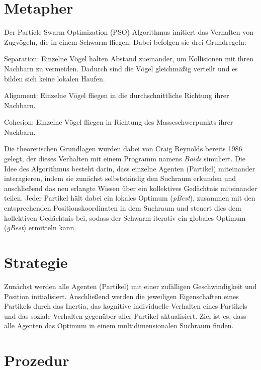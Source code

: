 
\section{Metapher}

Der Particle Swarm Optimization (PSO) Algorithmus imitiert das Verhalten von
Zugvögeln, die in einem Schwarm fliegen. Dabei befolgen sie drei Grundregeln:
\begin{enumerate}[{[i]}]
    \item Separation: Einzelne Vögel halten Abstand zueinander, um
        Kollisionen mit ihren Nachbarn zu vermeiden. Dadurch sind die Vögel
        gleichmäßig verteilt und es bilden sich keine lokalen Haufen.
    \item Alignment: Einzelne Vögel fliegen in die durchschnittliche
        Richtung ihrer Nachbarn. 
    \item Cohesion: Einzelne Vögel fliegen in Richtung des
        Masseschwerpunkts ihrer Nachbarn.
\end{enumerate}

Die theoretischen Grundlagen wurden dabei von Craig Reynolds bereits 1986
gelegt, der dieses Verhalten mit einem Programm namens \emph{Boids}
simuliert. Die Idee des Algorithmus besteht darin, dass einzelne Agenten
(Partikel) miteinander interagieren, indem sie zunächst selbstständig den
Suchraum erkunden und anschließend das neu erlangte Wissen über ein
kollektives Gedächtnis miteinander teilen. Jeder Partikel hält dabei
ein lokales Optimum (\emph{pBest}), zusammen mit den entsprechenden
Positionskoordinaten in dem Suchraum und steuert dies dem kollektiven
Gedächtnis bei, sodass der Schwarm iterativ ein globales Optimum (\emph{gBest})
ermitteln kann.

\section{Strategie}

Zunächst werden alle Agenten (Partikel) mit einer zufälligen Geschwindigkeit
und Position initialisiert. Anschließend werden die jeweiligen Eigenschaften
eines Partikels durch das Inertia, das kognitive individuelle Verhalten eines
Partikels und das soziale Verhalten gegenüber aller Partikel aktualisiert. Ziel
ist es, dass alle Agenten das Optimum in einem multidimensionalen Suchraum
finden.

\section{Prozedur}

